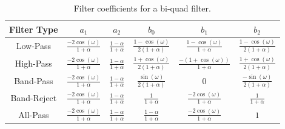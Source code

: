 \begin{table}[h!]

  \centering

  \renewcommand{\arraystretch}{3}
  \begin{tabular}[]{ | c | c | c | c | c | c |}
    \hline
    \rowcolor[gray]{0.8}
    Filter Type & $a_{1}$ & $a_{2}$ & $b_{0}$ & $b_{1}$ & $b_{2}$ \\
    \hline
    Low-Pass & $\frac{-2\cos(\omega)}{1 + \alpha}$ & $\frac{1 - \alpha}{1 + \alpha}$ & $\frac{1-\cos(\omega)}{2(1 + \alpha)}$ & $\frac{1-\cos(\omega)}{1 + \alpha}$ & $\frac{1-\cos(\omega)}{2(1 + \alpha)}$\\
    \hline
    High-Pass & $\frac{-2\cos(\omega)}{1 + \alpha}$ & $\frac{1 - \alpha}{1 + \alpha}$ & $\frac{1+\cos(\omega)}{2(1 + \alpha)}$ & $\frac{-(1+\cos(\omega))}{1 + \alpha}$ & $\frac{1+\cos(\omega)}{2(1 + \alpha)}$\\
    \hline
    Band-Pass & $\frac{-2\cos(\omega)}{1 + \alpha}$ & $\frac{1 - \alpha}{1 + \alpha}$ & $\frac{\sin(\omega)}{2(1 + \alpha)}$ & $0$ & $\frac{-\sin(\omega)}{2(1 + \alpha)}$\\
    \hline
    Band-Reject & $\frac{-2\cos(\omega)}{1 + \alpha}$ & $\frac{1 - \alpha}{1 + \alpha}$ & $\frac{1}{1 + \alpha}$ & $\frac{-2\cos(\omega)}{1 + \alpha}$ & $\frac{1}{1 + \alpha}$\\
    \hline
    All-Pass & $\frac{-2\cos(\omega)}{1 + \alpha}$ & $\frac{1 - \alpha}{1 + \alpha}$ & $\frac{1 - \alpha}{1 + \alpha}$ & $\frac{-2\cos(\omega)}{1 + \alpha}$ & $1$\\
    \hline
  \end{tabular}

  \caption{Filter coefficients for a bi-quad filter.}

  \label{tb:coef}

\end{table}
